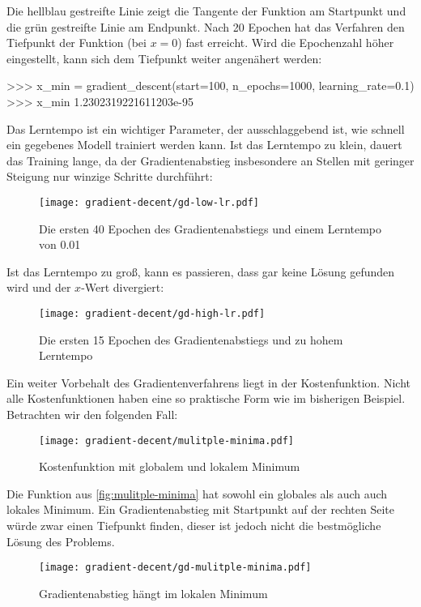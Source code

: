 \noindent
Die hellblau gestreifte Linie zeigt die Tangente der Funktion am Startpunkt und
die grün gestreifte Linie am Endpunkt. Nach 20 Epochen hat das Verfahren
den Tiefpunkt der Funktion (bei $x = 0$) fast erreicht.
Wird die Epochenzahl höher eingestellt, kann sich dem Tiefpunkt weiter angenähert werden:
\begin{pyconcode}
>>> x_min = gradient_descent(start=100, n_epochs=1000, learning_rate=0.1)
>>> x_min
1.2302319221611203e-95
\end{pyconcode}
Das Lerntempo ist ein wichtiger Parameter, der ausschlaggebend ist,
wie schnell ein gegebenes Modell trainiert werden kann.
Ist das Lerntempo zu klein, dauert das Training lange,
da der Gradientenabstieg insbesondere an Stellen mit geringer Steigung nur
winzige Schritte durchführt:
\begin{figure}[h!]
  \centering
  \texttt{[image: gradient-decent/gd-low-lr.pdf]}
  \caption{Die ersten 40 Epochen des Gradientenabstiegs und einem Lerntempo von \num{0.01}}
  \label{fig:gd-low-lr}
\end{figure}

\noindent
Ist das Lerntempo zu groß, kann es passieren, dass gar keine Lösung gefunden wird
und der $x$-Wert divergiert:
\newpage
\begin{figure}[h!]
  \centering
  \texttt{[image: gradient-decent/gd-high-lr.pdf]}
  \caption{Die ersten 15 Epochen des Gradientenabstiegs und zu hohem Lerntempo}
  \label{fig:gd-high-lr}
\end{figure}

\noindent
Ein weiter Vorbehalt des Gradientenverfahrens liegt in der Kostenfunktion.
Nicht alle Kostenfunktionen haben eine so praktische Form wie im bisherigen Beispiel.
Betrachten wir den folgenden Fall:
\begin{figure}[h!]
  \centering
  \texttt{[image: gradient-decent/mulitple-minima.pdf]}
  \caption{Kostenfunktion mit globalem und lokalem Minimum}
  \label{fig:mulitple-minima}
\end{figure}

\noindent
Die Funktion aus \autoref{fig:mulitple-minima} hat sowohl ein globales als auch auch
lokales Minimum. Ein Gradientenabstieg mit Startpunkt auf der rechten Seite würde
zwar einen Tiefpunkt finden, dieser ist jedoch nicht die bestmögliche Lösung des Problems.
\begin{figure}[h!]
  \centering
  \texttt{[image: gradient-decent/gd-mulitple-minima.pdf]}
  \caption{Gradientenabstieg hängt im lokalen Minimum}
  \label{fig:gd-mulitple-minima}
\end{figure}

